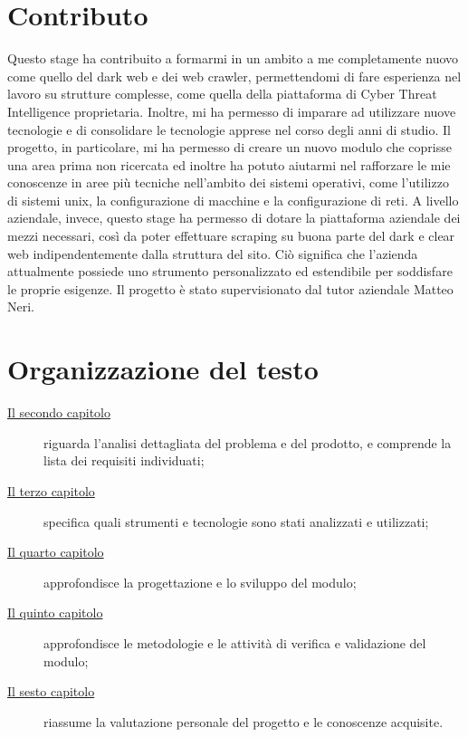 \section{Contributo}
Questo stage ha contribuito a formarmi in un ambito a me completamente nuovo come quello del dark web e dei web crawler, permettendomi di fare esperienza nel lavoro su strutture complesse, come quella della piattaforma di Cyber Threat Intelligence proprietaria. Inoltre, mi ha permesso di imparare ad utilizzare nuove tecnologie e di consolidare le tecnologie apprese nel corso degli anni di studio. Il progetto, in particolare, mi ha permesso di creare un nuovo modulo che coprisse una area prima non ricercata ed inoltre ha potuto aiutarmi nel rafforzare le mie conoscenze in aree più tecniche nell'ambito dei sistemi operativi, come l'utilizzo di sistemi unix, la configurazione di macchine e la configurazione di reti. A livello aziendale, invece, questo stage ha permesso di dotare la piattaforma aziendale dei mezzi necessari, così da poter effettuare scraping su buona parte del dark e clear web indipendentemente dalla struttura del sito. Ciò significa che l’azienda attualmente possiede uno strumento personalizzato ed estendibile per soddisfare le proprie esigenze. \newline{}
Il progetto è stato supervisionato dal tutor aziendale Matteo Neri.

\section{Organizzazione del testo}

\begin{description}
    \item[{\hyperref[cap:analisi-del-problema]{Il secondo capitolo}}] riguarda l'analisi dettagliata del problema e del prodotto, e comprende la lista dei requisiti individuati;
    
    \item[{\hyperref[cap:strumenti-e-tecnologie]{Il terzo capitolo}}] specifica quali strumenti e tecnologie sono stati analizzati e utilizzati;
    
    \item[{\hyperref[cap:progettazione-codifica]{Il quarto capitolo}}] approfondisce la progettazione e lo sviluppo del modulo;
    
    \item[{\hyperref[cap:verifica-validazione]{Il quinto capitolo}}] approfondisce le metodologie e le attività di verifica e validazione del modulo;
    
    \item[{\hyperref[cap:conclusioni]{Il sesto capitolo}}] riassume la valutazione personale del progetto e le conoscenze acquisite.
\end{description}

